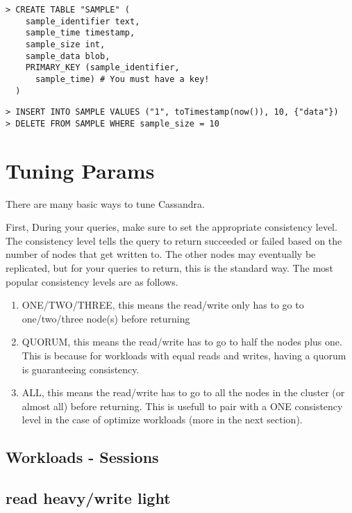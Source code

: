 \documentclass[9pt,twocolumn,twoside]{idsi}
\begin{document}
\begin{lstlisting}[breaklines]
> CREATE TABLE "SAMPLE" (
    sample_identifier text,
    sample_time timestamp,
    sample_size int,
    sample_data blob,
    PRIMARY_KEY (sample_identifier, 
      sample_time) # You must have a key!
  )
\end{lstlisting}

\begin{lstlisting}
> INSERT INTO SAMPLE VALUES ("1", toTimestamp(now()), 10, {"data"})
> DELETE FROM SAMPLE WHERE sample_size = 10
\end{lstlisting}

\section{Tuning Params}

There are many basic ways to tune Cassandra.

First, During your queries, make sure to set the appropriate consistency level. The consistency level tells the query to return succeeded or failed based on the number of nodes that get written to. The other nodes may eventually be replicated, but for your queries to return, this is the standard way. The most popular consistency levels are as follows.

\begin{enumerate}
\item ONE/TWO/THREE, this means the read/write only has to go to one/two/three node(s) before returning
\item QUORUM, this means the read/write has to go to half the nodes plus one. This is because for workloads with equal reads and writes, having a quorum is guaranteeing consistency.
\item ALL, this means the read/write has to go to all the nodes in the cluster (or almost all) before returning. This is usefull to pair with a ONE consistency level in the case of optimize workloads (more in the next section).
\end{enumerate}

\subsection{Workloads - Sessions}

\subsection{read heavy/write light}
\end{document}
